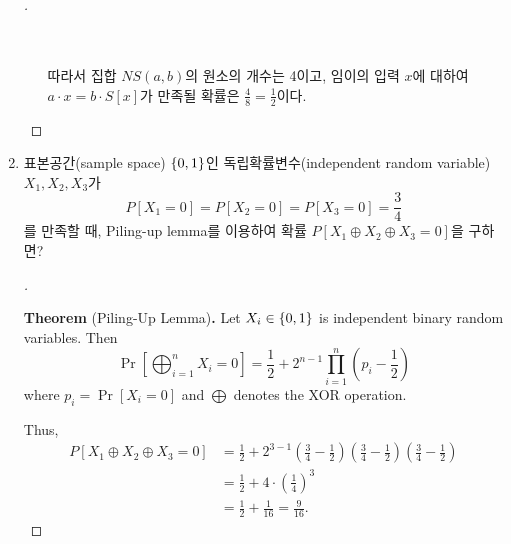 \begin{enumerate}[\bf 1.]
\begin{proof}[\sol]
\begin{enumerate}[(a)]
\begin{table}[h!]
\begin{tabular}{ccc|ccc|cc}
					\bottomrule[1.2pt]
				\end{tabular}
			\end{table}\\ 따라서 집합 $NS(a,b)$의 원소의 개수는 4이고, 임이의 입력 $x$에 대하여 $a\cdot x=b\cdot S[x]$가 만족될 확률은 $\frac{4}{8}=\frac{1}{2}$이다.
		\end{enumerate}
	\end{proof}
	\item 표본공간(sample space) $\set{0,1}$인 독립확률변수(independent random variable) $X_1,X_2,X_3$가 \[
	P[X_1=0]=P[X_2=0]=P[X_3=0]=\frac{3}{4}
	\]를 만족할 때, Piling-up lemma를 이용하여 확률 $P[X_1\oplus X_2\oplus X_3=0]$을 구하면?
	\begin{proof}[\sol]
		\ \begin{tcolorbox}[colback=white]
			\textbf{Theorem} (Piling-Up Lemma)\textbf{.}\quad
			Let $X_i\in\set{0,1}$ is independent binary random variables. Then \[
			\Pr\left[\bigoplus_{i=1}^nX_i=0\right]=\frac{1}{2}+2^{n-1}\prod_{i=1}^n\left(p_i-\frac{1}{2}\right)
			\] where $p_i=\Pr[X_i=0]$ and $\bigoplus$ denotes the XOR operation.
		\end{tcolorbox}
		Thus, \begin{align*}
			P[X_1\oplus X_2\oplus X_3=0] &= \frac{1}{2}+2^{3-1}\left(\frac{3}{4}-\frac{1}{2}\right)\left(\frac{3}{4}-\frac{1}{2}\right)\left(\frac{3}{4}-\frac{1}{2}\right)\\
			&=\frac{1}{2}+4\cdot\left(\frac{1}{4}\right)^3\\
			&=\frac{1}{2}+\frac{1}{16}=\frac{9}{16}.
		\end{align*}
	\end{proof}

\end{enumerate}
